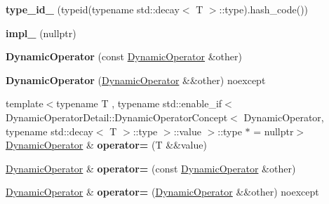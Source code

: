 \begin{DoxyCompactItemize}
\item 
\hypertarget{classSpacy_1_1DynamicOperator_a01db25aa408f302a1cd38e6083ea1fe5}{{\bfseries type\-\_\-id\-\_\-} (typeid(typename std\-::decay$<$ \-T $>$\-::type).hash\-\_\-code())}\label{classSpacy_1_1DynamicOperator_a01db25aa408f302a1cd38e6083ea1fe5}

\item 
\hypertarget{classSpacy_1_1DynamicOperator_adb4c82f3249fc355954de212c9ae7980}{{\bfseries impl\-\_\-} (nullptr)}\label{classSpacy_1_1DynamicOperator_adb4c82f3249fc355954de212c9ae7980}

\item 
\hypertarget{classSpacy_1_1DynamicOperator_a7d1e9efe9b3bd482d813f90fac5c5fa8}{{\bfseries \-Dynamic\-Operator} (const \hyperlink{classSpacy_1_1DynamicOperator}{\-Dynamic\-Operator} \&other)}\label{classSpacy_1_1DynamicOperator_a7d1e9efe9b3bd482d813f90fac5c5fa8}

\item 
\hypertarget{classSpacy_1_1DynamicOperator_a0496c72b7b18d413856ad008dbc3dfb1}{{\bfseries \-Dynamic\-Operator} (\hyperlink{classSpacy_1_1DynamicOperator}{\-Dynamic\-Operator} \&\&other) noexcept}\label{classSpacy_1_1DynamicOperator_a0496c72b7b18d413856ad008dbc3dfb1}

\item 
\hypertarget{classSpacy_1_1DynamicOperator_af03a1b856d668cbd78eaf9df83487a55}{{\footnotesize template$<$typename T , typename std\-::enable\-\_\-if$<$ Dynamic\-Operator\-Detail\-::\-Dynamic\-Operator\-Concept$<$ Dynamic\-Operator, typename std\-::decay$<$ T $>$\-::type $>$\-::value $>$\-::type $\ast$  = nullptr$>$ }\\\hyperlink{classSpacy_1_1DynamicOperator}{\-Dynamic\-Operator} \& {\bfseries operator=} (\-T \&\&value)}\label{classSpacy_1_1DynamicOperator_af03a1b856d668cbd78eaf9df83487a55}

\item 
\hypertarget{classSpacy_1_1DynamicOperator_a4c7e142093149504287dc0e4f2a7c9df}{\hyperlink{classSpacy_1_1DynamicOperator}{\-Dynamic\-Operator} \& {\bfseries operator=} (const \hyperlink{classSpacy_1_1DynamicOperator}{\-Dynamic\-Operator} \&other)}\label{classSpacy_1_1DynamicOperator_a4c7e142093149504287dc0e4f2a7c9df}

\item 
\hypertarget{classSpacy_1_1DynamicOperator_a70023d434a687589299918a4ffaf6eee}{\hyperlink{classSpacy_1_1DynamicOperator}{\-Dynamic\-Operator} \& {\bfseries operator=} (\hyperlink{classSpacy_1_1DynamicOperator}{\-Dynamic\-Operator} \&\&other) noexcept}\label{classSpacy_1_1DynamicOperator_a70023d434a687589299918a4ffaf6eee}


\end{DoxyCompactItemize}
